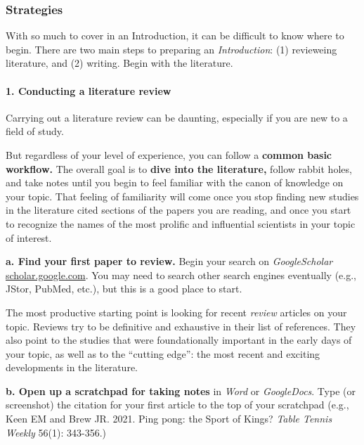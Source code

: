 \documentclass[
]{book}
\begin{document}
\hypertarget{strategies-1}{%
\subsubsection*{Strategies}\label{strategies-1}}

With so much to cover in an Introduction, it can be difficult to know where to begin. There are two main steps to preparing an \emph{Introduction}: (1) revieweing literature, and (2) writing. Begin with the literature.

\hypertarget{conducting-a-literature-review}{%
\paragraph*{1. Conducting a literature review}\label{conducting-a-literature-review}}

Carrying out a literature review can be daunting, especially if you are new to a field of study.

But regardless of your level of experience, you can follow a \textbf{common basic workflow.} The overall goal is to \textbf{dive into the literature,} follow rabbit holes, and take notes until you begin to feel familiar with the canon of knowledge on your topic. That feeling of familiarity will come once you stop finding new studies in the literature cited sections of the papers you are reading, and once you start to recognize the names of the most prolific and influential scientists in your topic of interest.

\textbf{a. Find your first paper to review.} Begin your search on \emph{GoogleScholar} \url{scholar.google.com}. You may need to search other search engines eventually (e.g., JStor, PubMed, etc.), but this is a good place to start.

The most productive starting point is looking for recent \emph{review} articles on your topic. Reviews try to be definitive and exhaustive in their list of references. They also point to the studies that were foundationally important in the early days of your topic, as well as to the ``cutting edge'': the most recent and exciting developments in the literature.

\textbf{b. Open up a scratchpad for taking notes} in \emph{Word} or \emph{GoogleDocs}. Type (or screenshot) the citation for your first article to the top of your scratchpad (e.g., Keen EM and Brew JR. 2021. Ping pong: the Sport of Kings? \emph{Table Tennis Weekly} 56(1): 343-356.)
\end{document}
